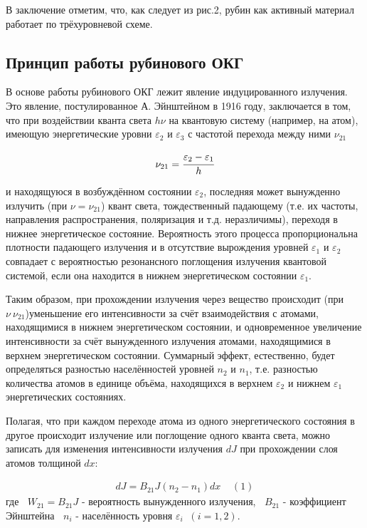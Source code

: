 \documentclass[a4paper,14pt,russian]{article}
\begin{document}
В заключение отметим, что, как следует из рис.2, рубин как активный материал работает по трёхуровневой схеме.

\subsection {Принцип работы рубинового ОКГ}

В основе работы рубинового ОКГ лежит явление индуцированного излучения. Это явление, постулированное А. Эйнштейном в 1916 году, заключается в том, что при воздействии кванта света $h \nu$ на квантовую систему (например, на атом), имеющую энергетические уровни $\varepsilon_2$ и $\varepsilon_3$ с частотой перехода между ними $\nu_{21}$

\begin{eqnarray}
\nu_{21} = \cfrac {\varepsilon_2 - \varepsilon_1} {h}
\end{eqnarray}

и находящуюся в возбуждённом состоянии $\varepsilon_2$, последняя может вынужденно излучить (при $\nu = \nu_{21}$) квант света, тождественный падающему (т.е. их частоты, направления распространения, поляризация и т.д. неразличимы), переходя в нижнее энергетическое состояние. Вероятность этого процесса пропорциональна плотности падающего излучения и в отсутствие вырождения уровней $\varepsilon_1$ и $\varepsilon_2$ совпадает с вероятностью резонансного поглощения излучения квантовой системой, если она находится в нижнем энергетическом состоянии $\varepsilon_1$.

Таким образом, при прохождении излучения через вещество происходит (при $\nu \ \nu_{21}$)уменьшение его интенсивности за счёт взаимодействия с атомами, находящимися в нижнем энергетическом состоянии, и одновременное увеличение интенсивности за счёт вынужденного излучения атомами, находящимися в верхнем энергетическом состоянии. Суммарный эффект, естественно, будет определяться разностью населённостей уровней $n_2$ и $n_1$, т.е. разностью количества атомов в единице объёма, находящихся в верхнем $\varepsilon_2$ и нижнем $\varepsilon_1$ энергетических состояниях.

Полагая, что при каждом переходе атома из одного энергетического состояния в другое происходит излучение или поглощение одного кванта света, можно записать для изменения интенсивности излучения $dJ$ при прохождении слоя атомов толщиной $dx$:

\begin{eqnarray}
dJ = B_{21} J(n_2 - n_1) dx\;\;\;\;(1)
\end{eqnarray}
где
$\;\; W_{21} = B_{21} J$ - вероятность вынужденного излучения,
$\;\; B_{21}$ - коэффициент Эйнштейна
$\;\; n_i$ - населённость уровня $\varepsilon_i \;\; (i = 1, 2)$.
\end{document}
